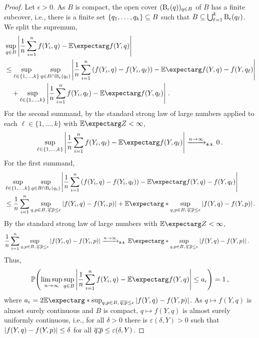 \begin{proof}
Let $\epsilon > 0$. As $B$ is compact, the open cover $(\operatorname{\mathrm{B}}_\epsilon(q))_{q \in B}$ of $B$ has a finite subcover, i.e., there is a finite set $\left\lbrace q_1, \dots, q_k \right\rbrace \subseteq B$ such that $B \subseteq \bigcup_{\ell=1}^k\operatorname{\mathrm{B}}_\epsilon(q_\ell)$. We split the supremum,
\begin{align*}
	&\sup_{q\in B} \abs{\frac 1n \sum_{i=1}^n f(Y_i, q) - \Ex{f(Y, q)}}
	\\&\leq
	\sup_{\ell \in \cb{1,\dots, k}} 
	\sup_{q\in B \cap \ball_\epsilon(q_\ell)}
		\abs{\frac 1n \sum_{i=1}^n \br{f(Y_i, q) - f(Y_i, q_\ell)} - \Ex{f(Y, q) - f(Y, q_\ell)}}
	\\&\quad+ 
	\sup_{\ell \in \cb{1,\dots, k}} \abs{\frac 1n \sum_{i=1}^n f(Y_i, q_\ell) - \Ex{f(Y, q_\ell)}}
	\eqfs
\end{align*}
For the second summand, by the standard strong law of large numbers applied to each $\ell\in\{1,\dots,k\}$ with $\Ex{Z} < \infty$, 
\begin{align*}
\sup_{\ell \in \cb{1,\dots, k}} \abs{\frac 1n \sum_{i=1}^n f(Y_i, q_\ell) - \Ex{f(Y, q_\ell)}} \xrightarrow{n \to \infty}_{\ms{a.s.}} 0
\eqfs
\end{align*}
For the first summand,
\begin{align*}
	&\sup_{\ell \in \cb{1,\dots, k}} 
	\sup_{q\in B \cap \ball_\epsilon(q_\ell)}
		\abs{\frac 1n \sum_{i=1}^n \br{f(Y_i, q) - f(Y_i, q_\ell)} - \Ex{f(Y, q) - f(Y, q_\ell)}}
	\\& \leq
	\frac 1n \sum_{i=1}^n \sup_{q,p\in B,\, \sol qp \leq \epsilon} \abs{f(Y_i, q) - f(Y_i, p)} 
	+ 
	\Ex*{\sup_{q,p\in B,\, \sol qp \leq \epsilon} \abs{f(Y, q) - f(Y, p)}} 
	\eqfs
\end{align*}
By the standard strong law of large numbers with $\Ex{Z} < \infty$, 
\begin{align*}
	\frac 1n \sum_{i=1}^n \sup_{q,p\in B,\, \sol qp \leq \epsilon} \abs{f(Y_i, q) - f(Y_i, p)} 
	&\xrightarrow{n \to \infty}_{\ms{a.s.}} 
	\Ex*{\sup_{q,p\in B,\, \sol qp \leq \epsilon} \abs{f(Y, q) - f(Y, p)} }
	\eqfs
\end{align*}
Thus,
\begin{equation}\label{eq:ulln:as_limsup}
	\PrOf{
		\limsup_{n\to\infty} \sup_{q\in B} \abs{\frac 1n \sum_{i=1}^n f(Y_i, q) - \Ex{f(Y, q)}}
		\leq
		a_\epsilon
	} = 1
	\eqcm
\end{equation}
where $a_\epsilon = 2 \Ex*{\sup_{q,p\in B,\, \sol qp \leq \epsilon} \abs{f(Y, q) - f(Y, p)} }$.
As $q \mapsto f(Y, q)$ is almost surely continuous and $B$ is compact, $q \mapsto f(Y, q)$ is almost surely uniformly continuous, i.e., for all $\delta > 0$ there is $\varepsilon(\delta, Y) > 0$ such that $\left| f(Y,q)-f(Y,p) \right| \leq \delta$ for all $\overline{q,\!p} \leq \varepsilon(\delta, Y)$.

\end{proof}
